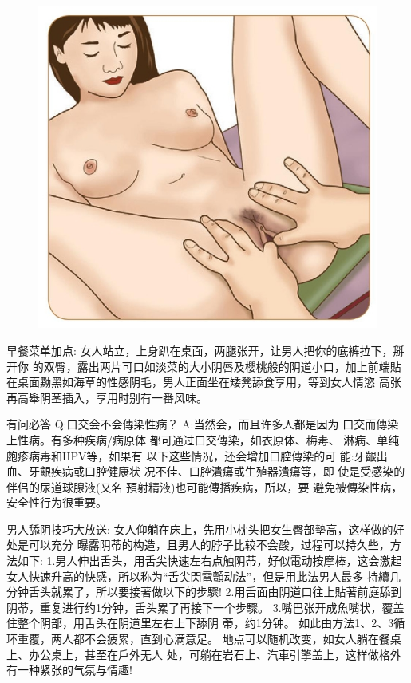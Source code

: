 \documentclass[12pt,UTF8]{ctexbook}
\begin{document}
\begin{figure}[htbp]
	\centering
	\includegraphics[width=0.7\linewidth]{23}
	\caption{}
	\label{fig:1}
\end{figure}

早餐菜单加点:
女人站立，上身趴在桌面，两腿张开，让男人把你的底裤拉下，掰开你
的双臀，露出两片可口如淡菜的大小阴唇及櫻桃般的阴道小口，加上前端貼
在桌面黝黑如海草的性感阴毛，男人正面坐在矮凳舔食享用，等到女人情慾
高张再高舉阴茎插入，享用时别有一番风味。

有问必答
Q:口交会不会傳染性病？
A:当然会，而且许多人都是因为
口交而傳染上性病。有多种疾病/病原体
都可通过口交傳染，如衣原体、梅毒、
淋病、单纯皰疹病毒和HPV等，如果有
以下这些情况，还会增加口腔傳染的可
能:牙齦出血、牙齦疾病或口腔健康状
况不佳、口腔潰瘍或生殖器潰瘍等，即
使是受感染的伴侣的尿道球腺液(又名
預射精液)也可能傳播疾病，所以，要
避免被傳染性病，安全性行为很重要。

男人舔阴技巧大放送:
女人仰躺在床上，先用小枕头把女生臀部墊高，这样做的好处是可以充分
曝露阴蒂的构造，且男人的脖子比较不会酸，过程可以持久些，方法如下:
1.男人伸出舌头，用舌尖快速左右点触阴蒂，好似電动按摩棒，这会激起
女人快速升高的快感，所以称为“舌尖閃電顫动法”，但是用此法男人最多
持續几分钟舌头就累了，所以要接著做以下的步驟!
2.用舌面由阴道口往上貼著前庭舔到阴蒂，重复进行约1分钟，舌头累了再接下一个步驟。
3.嘴巴张开成魚嘴状，覆盖住整个阴部，用舌头在阴道里左右上下舔阴
蒂，约1分钟。
如此由方法1、2、3循环重覆，两人都不会疲累，直到心满意足。
地点可以随机改变，如女人躺在餐桌上、办公桌上，甚至在戶外无人
处，可躺在岩石上、汽車引擎盖上，这样做格外有一种紧张的气氛与情趣!
\end{document}
